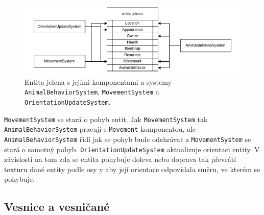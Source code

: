 \begin{figure}[!htb]
  \centering
  \includegraphics[width=1.0\linewidth]{img/deer.pdf}
  \caption{Entita jelena s jejími komponentami a systemy \texttt{AnimalBehaviorSystem}, \texttt{MovementSystem} a \texttt{OrientationUpdateSystem}.}
  \label{fig:deer}
\end{figure}

\texttt{MovementSystem} se stará o pohyb entit. Jak \texttt{MovementSystem} tak \texttt{AnimalBehaviorSystem} pracují s \texttt{Movement} komponentou, ale \texttt{AnimalBehaviorSystem} řídí jak se pohyb bude odehrávat a \texttt{MovementSystem} se stará o samotný pohyb. \texttt{OrientationUpdateSystem} aktualizuje orientaci entity. V závislosti na tom zda se entita pohybuje doleva nebo doprava tak převrátí texturu dané entity podle osy y aby její orientace odpovídala směru, ve kterém se pohybuje.

\subsection{Vesnice a vesničané}






































